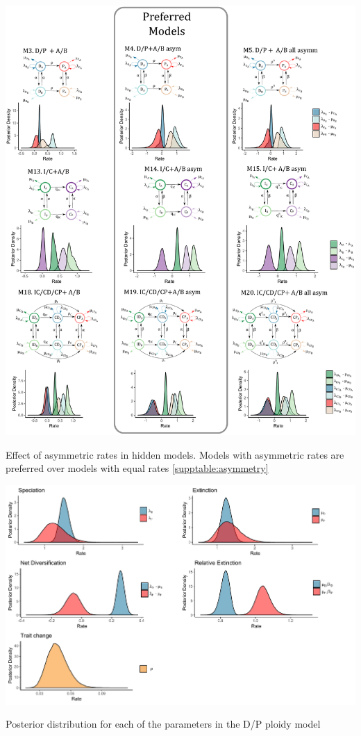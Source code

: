 \begin{suppfigure}
\includegraphics[width=\textwidth]{effectofasymmetry.pdf}
\caption{Effect of asymmetric rates in hidden models. Models with asymmetric rates are preferred over models with equal rates \cref{supptable:asymmetry}} %
\label{suppfigure:asymmetric}
\end{suppfigure}


\begin{suppfigure}
\includegraphics[width=\textwidth]{bisseDPnodipposteriordist.pdf}
\caption{Posterior distribution for each of the parameters in the D/P ploidy model} %
\label{suppfigure:DPnodip}
\end{suppfigure}

